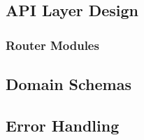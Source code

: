 \documentclass[a4paper,twoside]{sapthesis}
\begin{document}
\subsection{API Layer Design}

\subsubsection{Router Modules}
%
%
%
%
%
%
%
%
%

\subsection{Domain Schemas}

\subsection{Error Handling}
\end{document}
